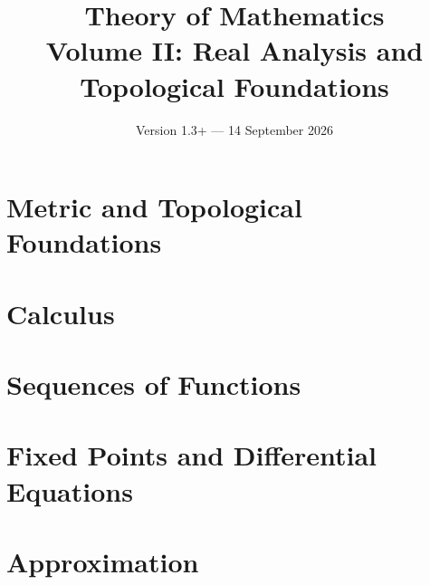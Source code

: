 \documentclass[11pt,a4paper,oneside,openany]{book}
\title{Theory of Mathematics\\[0.5em]\Large Volume II: Real Analysis and Topological Foundations}
\author{}
\date{Version 1.3+ --- 14 September 2026}
\begin{document}
\maketitle
\clearpage
\frontmatter
\tableofcontents


\mainmatter

\part{Metric and Topological Foundations}









\part{Calculus}




\part{Sequences of Functions}






\part{Fixed Points and Differential Equations}





\part{Approximation}







\backmatter

\end{document}
